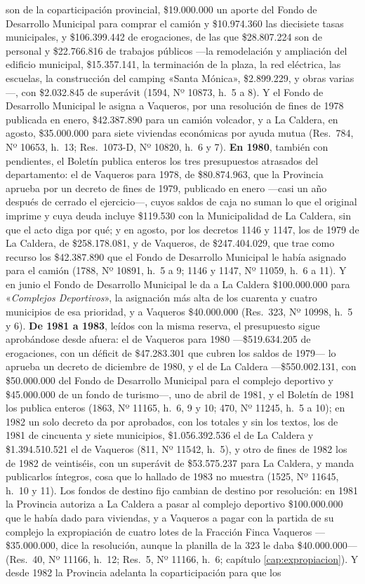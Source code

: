 son de la coparticipación provincial, \$19.000.000 un aporte del Fondo de Desarrollo Municipal para comprar el camión y \$10.974.360 las diecisiete tasas municipales, y \$106.399.442 de erogaciones, de las que \$28.807.224 son de personal y \$22.766.816 de trabajos públicos ---la remodelación y ampliación del edificio municipal, \$15.357.141, la terminación de la plaza, la red eléctrica, las escuelas, la construcción del camping «Santa Mónica», \$2.899.229, y obras varias---, con \$2.032.845 de superávit (1594, Nº 10873, h.\ 5 a 8). Y el Fondo de Desarrollo Municipal le asigna a Vaqueros, por una resolución de fines de 1978 publicada en enero, \$42.387.890 para un camión volcador, y a La Caldera, en agosto, \$35.000.000 para siete viviendas económicas por ayuda mutua (Res.\ 784, Nº 10653, h.\ 13; Res.\ 1073-D, Nº 10820, h.\ 6 y 7). \textbf{En 1980}, también con pendientes, el Boletín publica enteros los tres presupuestos atrasados del departamento: el de Vaqueros para 1978, de \$80.874.963, que la Provincia aprueba por un decreto de fines de 1979, publicado en enero ---casi un año después de cerrado el ejercicio---, cuyos saldos de caja no suman lo que el original imprime y cuya deuda incluye \$119.530 con la Municipalidad de La Caldera, sin que el acto diga por qué; y en agosto, por los decretos 1146 y 1147, los de 1979 de La Caldera, de \$258.178.081, y de Vaqueros, de \$247.404.029, que trae como recurso los \$42.387.890 que el Fondo de Desarrollo Municipal le había asignado para el camión (1788, Nº 10891, h.\ 5 a 9; 1146 y 1147, Nº 11059, h.\ 6 a 11). Y en junio el Fondo de Desarrollo Municipal le da a La Caldera \$100.000.000 para «\textit{Complejos Deportivos}», la asignación más alta de los cuarenta y cuatro municipios de esa prioridad, y a Vaqueros \$40.000.000 (Res.\ 323, Nº 10998, h.\ 5 y 6). \textbf{De 1981 a 1983}, leídos con la misma reserva, el presupuesto sigue aprobándose desde afuera: el de Vaqueros para 1980 ---\$519.634.205 de erogaciones, con un déficit de \$47.283.301 que cubren los saldos de 1979--- lo aprueba un decreto de diciembre de 1980, y el de La Caldera ---\$550.002.131, con \$50.000.000 del Fondo de Desarrollo Municipal para el complejo deportivo y \$45.000.000 de un fondo de turismo---, uno de abril de 1981, y el Boletín de 1981 los publica enteros (1863, Nº 11165, h.\ 6, 9 y 10; 470, Nº 11245, h.\ 5 a 10); en 1982 un solo decreto da por aprobados, con los totales y sin los textos, los de 1981 de cincuenta y siete municipios, \$1.056.392.536 el de La Caldera y \$1.394.510.521 el de Vaqueros (811, Nº 11542, h.\ 5), y otro de fines de 1982 los de 1982 de veintiséis, con un superávit de \$53.575.237 para La Caldera, y manda publicarlos íntegros, cosa que lo hallado de 1983 no muestra (1525, Nº 11645, h.\ 10 y 11). Los fondos de destino fijo cambian de destino por resolución: en 1981 la Provincia autoriza a La Caldera a pasar al complejo deportivo \$100.000.000 que le había dado para viviendas, y a Vaqueros a pagar con la partida de su complejo la expropiación de cuatro lotes de la Fracción Finca Vaqueros ---\$35.000.000, dice la resolución, aunque la planilla de la 323 le daba \$40.000.000--- (Res.\ 40, Nº 11166, h.\ 12; Res.\ 5, Nº 11166, h.\ 6; capítulo \ref{cap:expropiacion}). Y desde 1982 la Provincia adelanta la coparticipación para que los 
